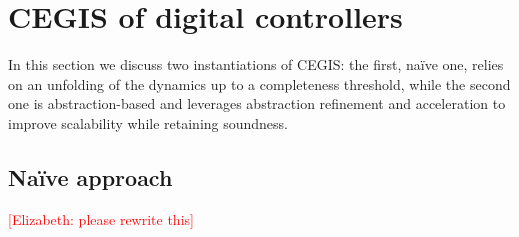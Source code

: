 \documentclass[twocolumn]{autart}    %
\begin{document}
\section{CEGIS of digital controllers} 
\label{sssec:cegisdig}

In this section we discuss two instantiations of CEGIS: the first,
na\"ive one, relies on an unfolding of the dynamics up to a
completeness threshold, while the second one is abstraction-based and
leverages abstraction refinement and acceleration to improve
scalability while retaining soundness.

\subsection{Na\"ive approach} 
\label{sssec:naive}

\textcolor{red}{[Elizabeth: please rewrite this]} 
\end{document}
